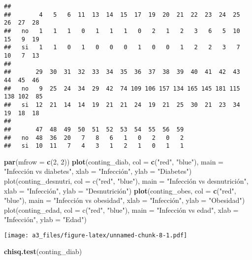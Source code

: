 \documentclass[]{article}
\newenvironment{Shaded}{\begin{snugshade}}{\end{snugshade}}
\newcommand{\DataTypeTok}[1]{\textcolor[rgb]{0.13,0.29,0.53}{#1}}
\newcommand{\DecValTok}[1]{\textcolor[rgb]{0.00,0.00,0.81}{#1}}
\newcommand{\KeywordTok}[1]{\textcolor[rgb]{0.13,0.29,0.53}{\textbf{#1}}}
\newcommand{\NormalTok}[1]{#1}
\newcommand{\StringTok}[1]{\textcolor[rgb]{0.31,0.60,0.02}{#1}}
\begin{document}
\begin{verbatim}
##     
##        4   5   6  11  13  14  15  17  19  20  21  22  23  24  25  26  27  28
##   no   1   1   1   0   1   1   1   0   2   1   2   3   6   5  10  15   9  19
##   si   1   1   0   1   0   0   0   1   0   0   1   2   2   3   7  10   7  13
##     
##       29  30  31  32  33  34  35  36  37  38  39  40  41  42  43  44  45  46
##   no   9  25  24  34  29  42  74 109 106 157 134 165 145 181 115 138 102  85
##   si  12  21  14  14  19  21  21  24  19  21  25  30  21  23  34  19  18  18
##     
##       47  48  49  50  51  52  53  54  55  56  59
##   no  48  36  20   7   8   6   1   0   2   0   2
##   si  10  11   7   4   3   1   2   1   0   1   1
\end{verbatim}

\begin{Shaded}
\begin{Highlighting}[]
\KeywordTok{par}\NormalTok{(}\DataTypeTok{mfrow =} \KeywordTok{c}\NormalTok{(}\DecValTok{2}\NormalTok{, }\DecValTok{2}\NormalTok{))}
\KeywordTok{plot}\NormalTok{(conting_diab, }\DataTypeTok{col =} \KeywordTok{c}\NormalTok{(}\StringTok{"red"}\NormalTok{, }\StringTok{"blue"}\NormalTok{), }\DataTypeTok{main =} \StringTok{"Infección vs diabetes"}\NormalTok{, }\DataTypeTok{xlab =} \StringTok{"Infección", ylab = "}\NormalTok{Diabetes}\StringTok{")}
\StringTok{plot(conting_desnutri, col = c("}\NormalTok{red}\StringTok{", "}\NormalTok{blue}\StringTok{"), main = "}\NormalTok{Infección vs desnutrición", }\DataTypeTok{xlab =} \StringTok{"Infección", ylab = "}\NormalTok{Desnutrición")}
\KeywordTok{plot}\NormalTok{(conting_obes, }\DataTypeTok{col =} \KeywordTok{c}\NormalTok{(}\StringTok{"red"}\NormalTok{, }\StringTok{"blue"}\NormalTok{), }\DataTypeTok{main =} \StringTok{"Infección vs obesidad"}\NormalTok{, }\DataTypeTok{xlab =} \StringTok{"Infección", ylab = "}\NormalTok{Obesidad}\StringTok{")}
\StringTok{plot(conting_edad, col = c("}\NormalTok{red}\StringTok{", "}\NormalTok{blue}\StringTok{"), main = "}\NormalTok{Infección vs edad}\StringTok{", xlab = "}\NormalTok{Infección", }\DataTypeTok{ylab =} \StringTok{"Edad"}\NormalTok{)}
\end{Highlighting}
\end{Shaded}

\texttt{[image: a3\_files/figure-latex/unnamed-chunk-8-1.pdf]}

\begin{Shaded}
\begin{Highlighting}[]
\KeywordTok{chisq.test}\NormalTok{(conting_diab)}
\end{Highlighting}
\end{Shaded}
\end{document}
